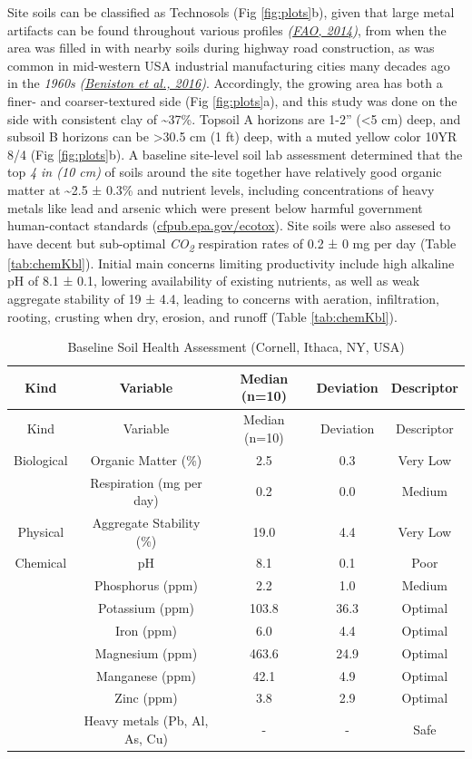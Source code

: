 \documentclass[
  12pt,
]{article}
\begin{document}
Site soils can be classified as Technosols (Fig \ref{fig:plots}b), given that large metal artifacts can be found throughout various profiles \emph{(\protect\hyperlink{ref-fao14}{FAO, 2014})}, from when the area was filled in with nearby soils during highway road construction, as was common in mid-western USA industrial manufacturing cities many decades ago in the \emph{1960s} \emph{(\protect\hyperlink{ref-beniston16}{Beniston et al., 2016})}.
Accordingly, the growing area has both a finer- and coarser-textured side (Fig \ref{fig:plots}a),
and this study was done on the side with consistent clay of \textasciitilde37\%.
Topsoil A horizons are 1-2'' (\textless5 cm) deep, and subsoil B horizons can be \textgreater30.5 cm (1 ft) deep, with a muted yellow color 10YR 8/4 (Fig \ref{fig:plots}b).
A baseline site-level soil lab assessment determined that the top \emph{4 in (10 cm)} of soils around the site together have relatively good organic matter at
\textasciitilde2.5 ±
0.3\%
and nutrient levels, including concentrations of heavy metals like lead and arsenic which were present below harmful government human-contact standards (\url{cfpub.epa.gov/ecotox}).
Site soils were also assesed to have decent but sub-optimal \emph{CO\textsubscript{2}} respiration rates of
0.2 ±
0 mg per day
(Table \ref{tab:chemKbl}).
Initial main concerns limiting productivity include high alkaline pH of
8.1 ±
0.1,
lowering availability of existing nutrients, as well as weak aggregate stability of
19 ±
4.4,
leading to concerns with aeration, infiltration, rooting, crusting when dry, erosion, and runoff (Table \ref{tab:chemKbl}).

\begin{longtable}[]{@{}ccccc@{}}
\caption{\label{tab:chem}Baseline Soil Health Assessment (Cornell, Ithaca, NY, USA)}\tabularnewline
\toprule
Kind & Variable & Median (n=10) & Deviation & Descriptor \\
\midrule
\endfirsthead
\toprule
Kind & Variable & Median (n=10) & Deviation & Descriptor \\
\midrule
\endhead
Biological & Organic Matter (\%) & 2.5 & 0.3 & Very Low \\
& Respiration (mg per day) & 0.2 & 0.0 & Medium \\
Physical & Aggregate Stability (\%) & 19.0 & 4.4 & Very Low \\
Chemical & pH & 8.1 & 0.1 & Poor \\
& Phosphorus (ppm) & 2.2 & 1.0 & Medium \\
& Potassium (ppm) & 103.8 & 36.3 & Optimal \\
& Iron (ppm) & 6.0 & 4.4 & Optimal \\
& Magnesium (ppm) & 463.6 & 24.9 & Optimal \\
& Manganese (ppm) & 42.1 & 4.9 & Optimal \\
& Zinc (ppm) & 3.8 & 2.9 & Optimal \\
& Heavy metals (Pb, Al, As, Cu) & - & - & Safe \\
\bottomrule
\end{longtable}
\end{document}
